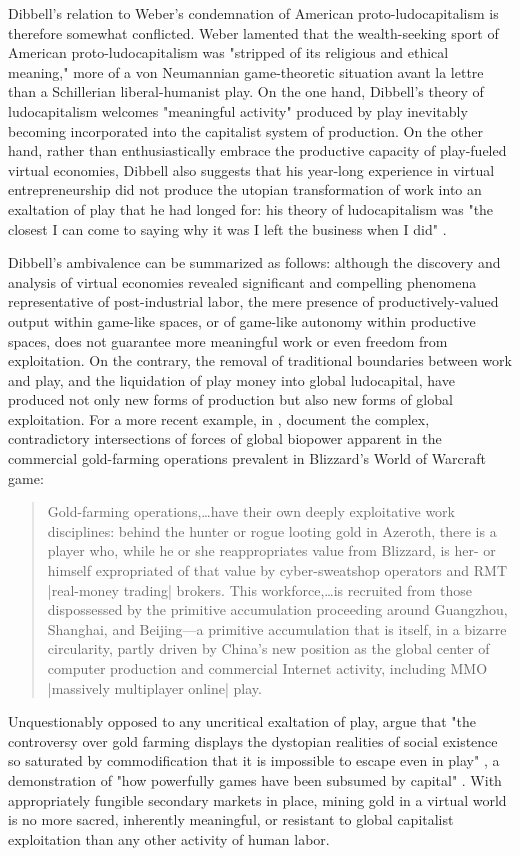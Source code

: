 Dibbell's relation to Weber's condemnation of American proto-ludocapitalism is therefore somewhat conflicted. Weber lamented that the wealth-seeking sport of American proto-ludocapitalism was "stripped of its religious and ethical meaning," more of a von Neumannian game-theoretic situation avant la lettre than a Schillerian liberal-humanist play. On the one hand, Dibbell's theory of ludocapitalism welcomes "meaningful activity" produced by play inevitably becoming incorporated into the capitalist system of production. On the other hand, rather than enthusiastically embrace the productive capacity of play-fueled virtual economies, Dibbell also suggests that his year-long experience in virtual entrepreneurship did not produce the utopian transformation of work into an exaltation of play that he had longed for: his theory of ludocapitalism was "the closest I can come to saying why it was I left the business when I did" \autocite[299]{Dibbell2007-dd}.

Dibbell's ambivalence can be summarized as follows: although the discovery and analysis of virtual economies revealed significant and compelling phenomena representative of post-industrial labor, the mere presence of productively-valued output within game-like spaces, or of game-like autonomy within productive spaces, does not guarantee more meaningful work or even freedom from exploitation. On the contrary, the removal of traditional boundaries between work and play, and the liquidation of play money into global ludocapital, have produced not only new forms of production but also new forms of global exploitation. For a more recent example, in , \citeauthor{Dyer-Witheford09} document the complex, contradictory intersections of forces of global biopower apparent in the commercial gold-farming operations prevalent in Blizzard's World of Warcraft game:
\blockcquote[149]{Dyer-Witheford09}{
  Gold-farming operations,…have their own deeply exploitative work disciplines: behind the hunter or rogue looting gold in Azeroth, there is a player who, while he or she reappropriates value from Blizzard, is her- or himself expropriated of that value by cyber-sweatshop operators and RMT |real-money trading| brokers. This workforce,…is recruited from those dispossessed by the primitive accumulation proceeding around Guangzhou, Shanghai, and Beijing---a primitive accumulation that is itself, in a bizarre circularity, partly driven by China's new position as the global center of computer production and commercial Internet activity, including MMO |massively multiplayer online| play.
}
Unquestionably opposed to any uncritical exaltation of play, \citeauthor{Dyer-Witheford09} argue that "the controversy over gold farming displays the dystopian realities of social existence so saturated by commodification that it is impossible to escape even in play" \autocite[150]{Dyer-Witheford09}, a demonstration of "how powerfully games have been subsumed by capital" \autocite[151]{Dyer-Witheford09}. With appropriately fungible secondary markets in place, mining gold in a virtual world is no more sacred, inherently meaningful, or resistant to global capitalist exploitation than any other activity of human labor.

